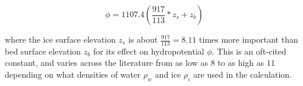 \begin{equation}\label{eq:4.13}
  \phi = 1107.4\left(\frac{917}{113} * z_s + z_b \right)
\end{equation}

where the ice surface elevation $z_s$ is about $\frac{917}{113} = 8.11$ times more important than bed surface elevation $z_b$ for its effect on hydropotential $\phi$.
This is an oft-cited constant, and varies across the literature from as low as $8$ to as high as $11$ depending on what densities of water $\rho_w$ and ice $\rho_i$ are used in the calculation.


